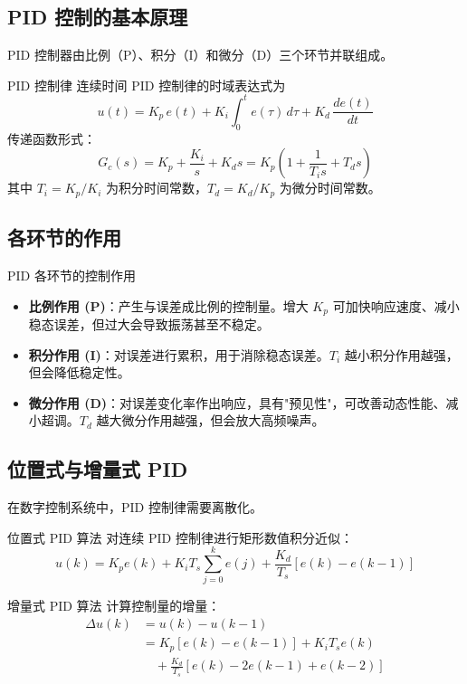 \subsection{PID 控制的基本原理}

PID 控制器由比例（P）、积分（I）和微分（D）三个环节并联组成。

\begin{mydefinition}{PID 控制律}
连续时间 PID 控制律的时域表达式为
\[
u(t) = K_p\,e(t) + K_i\int_0^t e(\tau)\,d\tau + K_d\,\frac{de(t)}{dt}
\]
传递函数形式：
\[
G_c(s) = K_p + \frac{K_i}{s} + K_d s = K_p\left(1 + \frac{1}{T_i s} + T_d s\right)
\]
其中 $T_i = K_p/K_i$ 为积分时间常数，$T_d = K_d/K_p$ 为微分时间常数。
\end{mydefinition}

\subsection{各环节的作用}

\begin{myTheorem}{PID 各环节的控制作用}
\begin{itemize}
    \item \textbf{比例作用 (P)}：产生与误差成比例的控制量。增大 $K_p$ 可加快响应速度、减小稳态误差，但过大会导致振荡甚至不稳定。
    \item \textbf{积分作用 (I)}：对误差进行累积，用于消除稳态误差。$T_i$ 越小积分作用越强，但会降低稳定性。
    \item \textbf{微分作用 (D)}：对误差变化率作出响应，具有"预见性"，可改善动态性能、减小超调。$T_d$ 越大微分作用越强，但会放大高频噪声。
\end{itemize}
\end{myTheorem}

\subsection{位置式与增量式 PID}

在数字控制系统中，PID 控制律需要离散化。

\begin{mydefinition}{位置式 PID 算法}
对连续 PID 控制律进行矩形数值积分近似：
\[
u(k) = K_p e(k) + K_i T_s \sum_{j=0}^{k} e(j) + \frac{K_d}{T_s}[e(k) - e(k-1)]
\]
\end{mydefinition}

\begin{mydefinition}{增量式 PID 算法}
计算控制量的增量：
\begin{align}
\Delta u(k) &= u(k) - u(k-1) \\
&= K_p[e(k)-e(k-1)] + K_i T_s e(k) \\
&\quad + \frac{K_d}{T_s}[e(k) - 2e(k-1) + e(k-2)]
\end{align}
\end{mydefinition}


